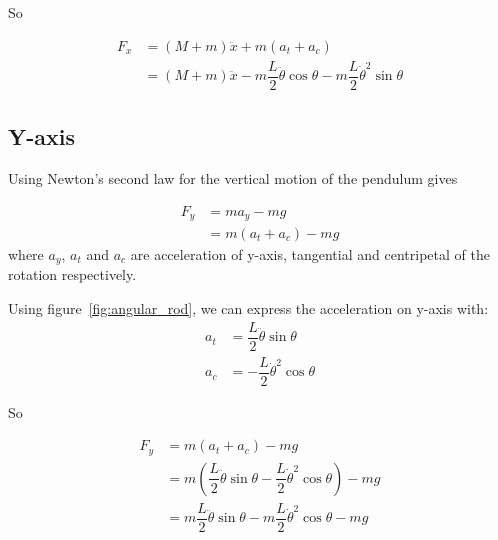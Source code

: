 \documentclass{notes}
\begin{document}
So 

\begin{align}
  F_x & = (M+m) \ddot{x} + m (a_{t} + a_{c})\nonumber\\
         & = (M+m) \ddot{x} -m\dfrac{L}{2} \ddot{\theta} \cos \theta 
                        -m\dfrac{L}{2} \dot{\theta}^2 \sin \theta 
\end{align}
\FloatBarrier


\subsection{Y-axis}
Using Newton's second law for the vertical motion of the pendulum gives

\begin{align*}
  F_y & = ma_y - mg \\
      & = m(a_t + a_c) - mg
\end{align*}
where $a_y$, $a_t$ and $a_c$ are acceleration of y-axis, tangential and centripetal of the rotation
respectively. 

Using figure~\ref{fig:angular_rod}, we can express the acceleration on y-axis with:
\begin{align*}
  a_t & = \dfrac{L}{2}\ddot{\theta}\sin\theta \\
  a_c & = -\dfrac{L}{2}\dot{\theta}^2\cos\theta
\end{align*}

So

\begin{align}
  F_y & = m(a_t + a_c) - mg \nonumber\\
      & = m(\dfrac{L}{2}\ddot{\theta}\sin\theta - \dfrac{L}{2}\dot{\theta}^2\cos\theta) - mg
      \nonumber\\ 
      & = m\dfrac{L}{2}\ddot{\theta}\sin\theta - m\dfrac{L}{2}\dot{\theta}^2\cos\theta - mg
       \label{eqn:f_y}
\end{align}


 
\end{document}
